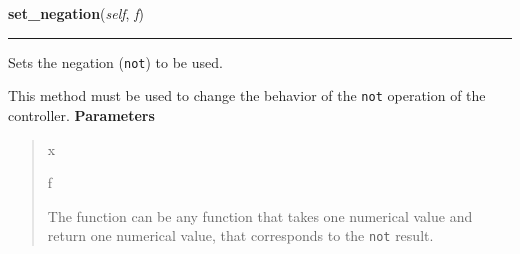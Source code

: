 \hspace{.8\funcindent}\begin{boxedminipage}{\funcwidth}

    \raggedright \textbf{set\_negation}(\textit{self}, \textit{f})

    \vspace{-1.5ex}

    \rule{\textwidth}{0.5\fboxrule}
\setlength{\parskip}{2ex}

Sets the negation (\texttt{not}) to be used.

This method must be used to change the behavior of the \texttt{not} operation
of the controller.
\setlength{\parskip}{1ex}
      \textbf{Parameters}
      \vspace{-1ex}

      \begin{quote}
        \begin{Ventry}{x}

          \item[f]


The function can be any function that takes one numerical value and
return one numerical value, that corresponds to the \texttt{not} result.
        \end{Ventry}

      \end{quote}

    \end{boxedminipage}

    \label{peach:fuzzy:control:Controller:set_implication}

    \vspace{0.5ex}

